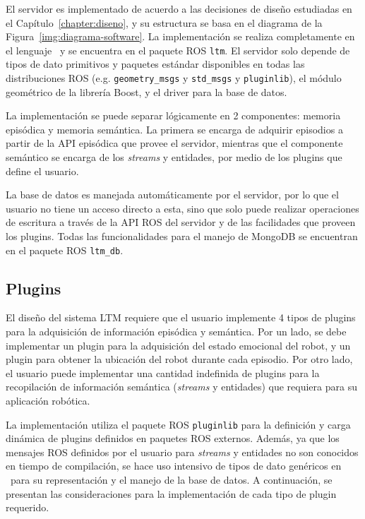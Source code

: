 El servidor es implementado de acuerdo a las decisiones de diseño estudiadas en el Capítulo~\ref{chapter:diseno}, y su estructura se basa en el diagrama de la Figura~\ref{img:diagrama-software}. La implementación se realiza completamente en el lenguaje \CC \ y se encuentra en el paquete ROS \texttt{ltm}. El servidor solo depende de tipos de dato primitivos y paquetes estándar disponibles en todas las distribuciones ROS (e.g. \texttt{geometry\_msgs} y \texttt{std\_msgs} y \texttt{pluginlib}), el módulo geométrico de la librería Boost, y el driver para la base de datos. 

La implementación se puede separar lógicamente en 2 componentes: memoria episódica y memoria semántica. La primera se encarga de adquirir episodios a partir de la API episódica que provee el servidor, mientras que el componente semántico se encarga de los \textit{streams} y entidades, por medio de los plugins que define el usuario.

La base de datos es manejada automáticamente por el servidor, por lo que el usuario no tiene un acceso directo a esta, sino que solo puede realizar operaciones de escritura a través de la API ROS del servidor y de las facilidades que proveen los plugins. Todas las funcionalidades para el manejo de MongoDB se encuentran en el paquete ROS \texttt{ltm\_db}.


\subsection{Plugins}

El diseño del sistema LTM requiere que el usuario implemente 4 tipos de plugins para la adquisición de información episódica y semántica. Por un lado, se debe implementar un plugin para la adquisición del estado emocional del robot, y un plugin para obtener la ubicación del robot durante cada episodio. Por otro lado, el usuario puede implementar una cantidad indefinida de plugins para la recopilación de información semántica (\textit{streams} y entidades) que requiera para su aplicación robótica.

La implementación utiliza el paquete ROS \texttt{pluginlib} para la definición y carga dinámica de plugins definidos en paquetes ROS externos. Además, ya que los mensajes ROS definidos por el usuario para \textit{streams} y entidades no son conocidos en tiempo de compilación, se hace uso intensivo de tipos de dato genéricos en \CC \ para su representación y el manejo de la base de datos. A continuación, se presentan las consideraciones para la implementación de cada tipo de plugin requerido.


